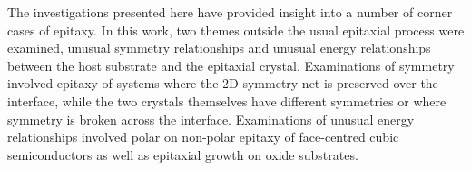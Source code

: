 The investigations presented here have provided insight into a number of corner cases of epitaxy. In this work, two themes outside the usual epitaxial process were examined, unusual symmetry relationships and unusual energy relationships between the host substrate and the epitaxial crystal. Examinations of symmetry involved epitaxy of systems where the 2D symmetry net is preserved over the interface, while the two crystals themselves have different symmetries or where symmetry is broken across the interface. Examinations of unusual energy relationships involved polar on non-polar epitaxy of face-centred cubic semiconductors as well as epitaxial growth on oxide substrates.

